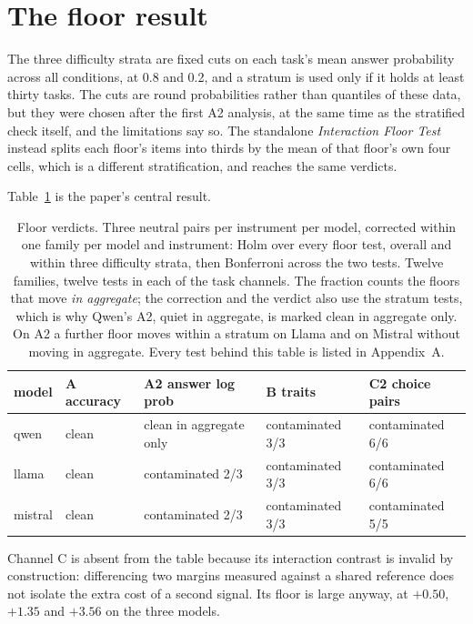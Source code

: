 \documentclass[11pt]{article}
\begin{document}
\section{The floor result}

The three difficulty strata are fixed cuts on each task's mean answer
probability across all conditions, at 0.8 and 0.2, and a stratum is used only
if it holds at least thirty tasks. The cuts are round probabilities rather than
quantiles of these data, but they were chosen after the first A2 analysis, at
the same time as the stratified check itself, and the limitations say so. The
standalone \emph{Interaction Floor Test} instead splits each floor's items into
thirds by the mean of that floor's own four cells, which is a different
stratification, and reaches the same verdicts.

Table~\ref{tab:floors} is the paper's central result.

\begin{table}[h]
\centering
\caption{Floor verdicts. Three neutral pairs per instrument per model,
corrected within one family per model and instrument: Holm over every floor
test, overall and within three difficulty strata, then Bonferroni across the two
tests. Twelve families, twelve tests in each of the task channels. The fraction
counts the floors that move \emph{in aggregate}; the correction and the verdict
also use the stratum tests, which is why Qwen's A2, quiet in aggregate, is
marked clean in aggregate only. On A2 a further floor moves within a stratum on
Llama and on Mistral without moving in aggregate. Every test behind this table
is listed in Appendix~A.}
\label{tab:floors}
\begin{tabular}{lllll}
\toprule
model & A accuracy & A2 answer log prob & B traits & C2 choice pairs \\
\midrule
qwen & clean & clean in aggregate only & contaminated 3/3 & contaminated 6/6 \\
llama & clean & contaminated 2/3 & contaminated 3/3 & contaminated 6/6 \\
mistral & clean & contaminated 2/3 & contaminated 3/3 & contaminated 5/5 \\
\bottomrule
\end{tabular}
\end{table}

Channel C is absent from the table because its interaction contrast is invalid
by construction: differencing two margins measured against a shared reference
does not isolate the extra cost of a second signal. Its floor is large anyway,
at $+0.50$, $+1.35$ and $+3.56$ on the three models.
\end{document}
